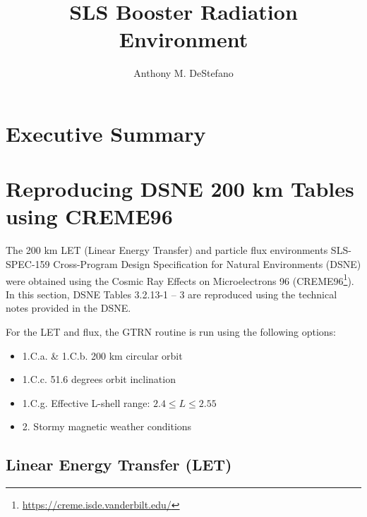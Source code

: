 \documentclass{hitec}
\title{SLS Booster Radiation Environment}
\author{Anthony M. DeStefano}
\begin{document}
\maketitle
{}

\tableofcontents
\listoffigures
\listoftables
\lstlistoflistings
\newpage






\cleardoublepage
{}
\section{Executive Summary}


\newpage
\section{Reproducing DSNE 200 km Tables using CREME96}

The 200 km LET (Linear Energy Transfer) and particle flux environments SLS-SPEC-159 Cross-Program Design Specification for Natural Environments (DSNE) were obtained using the Cosmic Ray Effects on Microelectrons 96 (CREME96\footnote{\url{https://creme.isde.vanderbilt.edu/}}). In this section, DSNE Tables 3.2.13-1 -- 3 are reproduced using the technical notes provided in the DSNE.

For the LET and flux, the \textsf{GTRN} routine is run using the following options:
\begin{itemize}
	\item 1.C.a. \& 1.C.b. 200 km circular orbit
	\item 1.C.c. 51.6 degrees orbit inclination
	\item 1.C.g. Effective L-shell range: $2.4 \le L \le 2.55$
	\item 2. Stormy magnetic weather conditions
\end{itemize}

\subsection{Linear Energy Transfer (LET)}\label{ssec:LET}
\end{document}
